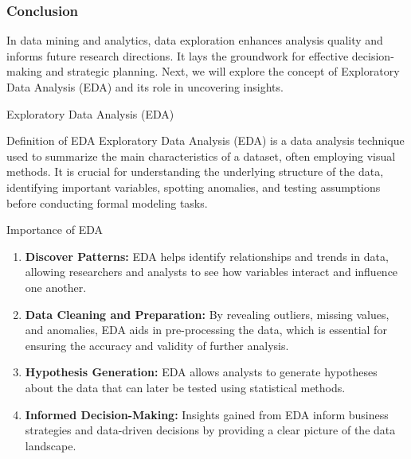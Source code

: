 \documentclass[aspectratio=169]{beamer}
\begin{document}
\begin{frame}[fragile]
    \frametitle{Conclusion}
    In data mining and analytics, data exploration enhances analysis quality and informs future research directions. It lays the groundwork for effective decision-making and strategic planning. Next, we will explore the concept of Exploratory Data Analysis (EDA) and its role in uncovering insights.
\end{frame}

\begin{frame}[fragile]{Exploratory Data Analysis (EDA)}
    \begin{block}{Definition of EDA}
        Exploratory Data Analysis (EDA) is a data analysis technique used to summarize the main characteristics of a dataset, often employing visual methods. It is crucial for understanding the underlying structure of the data, identifying important variables, spotting anomalies, and testing assumptions before conducting formal modeling tasks.
    \end{block}
\end{frame}

\begin{frame}[fragile]{Importance of EDA}
    \begin{enumerate}
        \item \textbf{Discover Patterns:} 
        EDA helps identify relationships and trends in data, allowing researchers and analysts to see how variables interact and influence one another.
        
        \item \textbf{Data Cleaning and Preparation:} 
        By revealing outliers, missing values, and anomalies, EDA aids in pre-processing the data, which is essential for ensuring the accuracy and validity of further analysis.
        
        \item \textbf{Hypothesis Generation:} 
        EDA allows analysts to generate hypotheses about the data that can later be tested using statistical methods.
        
        \item \textbf{Informed Decision-Making:} 
        Insights gained from EDA inform business strategies and data-driven decisions by providing a clear picture of the data landscape.
    \end{enumerate}
\end{frame}
\end{document}
